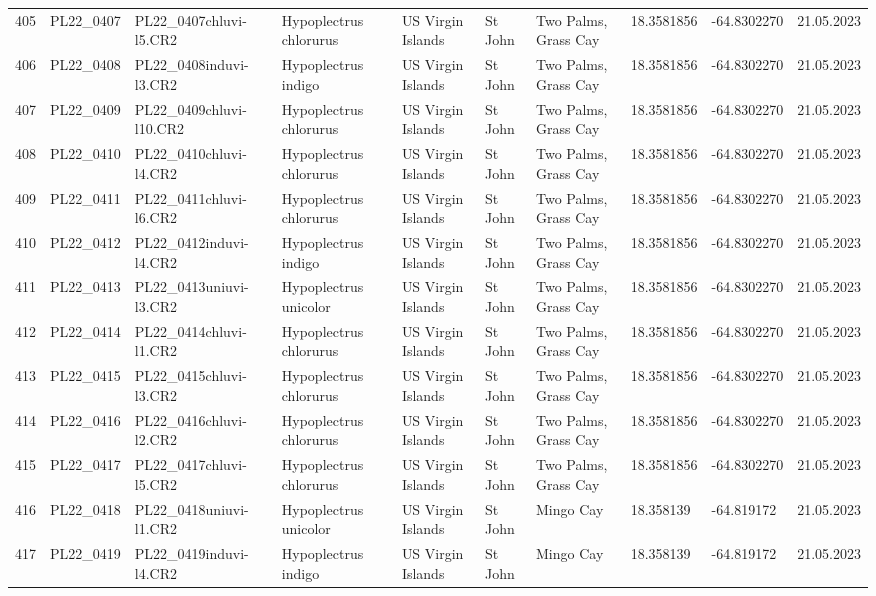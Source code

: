 \begin{table}[ht]
\begin{tabular}{rlllllllll}
  405 & PL22\_0407 & PL22\_0407chluvi-l5.CR2 & Hypoplectrus chlorurus & US Virgin Islands & St John & Two Palms, Grass Cay & 18.3581856 & -64.8302270 & 21.05.2023 \\ 
  406 & PL22\_0408 & PL22\_0408induvi-l3.CR2 & Hypoplectrus indigo & US Virgin Islands & St John & Two Palms, Grass Cay & 18.3581856 & -64.8302270 & 21.05.2023 \\ 
  407 & PL22\_0409 & PL22\_0409chluvi-l10.CR2 & Hypoplectrus chlorurus & US Virgin Islands & St John & Two Palms, Grass Cay & 18.3581856 & -64.8302270 & 21.05.2023 \\ 
  408 & PL22\_0410 & PL22\_0410chluvi-l4.CR2 & Hypoplectrus chlorurus & US Virgin Islands & St John & Two Palms, Grass Cay & 18.3581856 & -64.8302270 & 21.05.2023 \\ 
  409 & PL22\_0411 & PL22\_0411chluvi-l6.CR2 & Hypoplectrus chlorurus & US Virgin Islands & St John & Two Palms, Grass Cay & 18.3581856 & -64.8302270 & 21.05.2023 \\ 
  410 & PL22\_0412 & PL22\_0412induvi-l4.CR2 & Hypoplectrus indigo & US Virgin Islands & St John & Two Palms, Grass Cay & 18.3581856 & -64.8302270 & 21.05.2023 \\ 
  411 & PL22\_0413 & PL22\_0413uniuvi-l3.CR2 & Hypoplectrus unicolor & US Virgin Islands & St John & Two Palms, Grass Cay & 18.3581856 & -64.8302270 & 21.05.2023 \\ 
  412 & PL22\_0414 & PL22\_0414chluvi-l1.CR2 & Hypoplectrus chlorurus & US Virgin Islands & St John & Two Palms, Grass Cay & 18.3581856 & -64.8302270 & 21.05.2023 \\ 
  413 & PL22\_0415 & PL22\_0415chluvi-l3.CR2 & Hypoplectrus chlorurus & US Virgin Islands & St John & Two Palms, Grass Cay & 18.3581856 & -64.8302270 & 21.05.2023 \\ 
  414 & PL22\_0416 & PL22\_0416chluvi-l2.CR2 & Hypoplectrus chlorurus & US Virgin Islands & St John & Two Palms, Grass Cay & 18.3581856 & -64.8302270 & 21.05.2023 \\ 
  415 & PL22\_0417 & PL22\_0417chluvi-l5.CR2 & Hypoplectrus chlorurus & US Virgin Islands & St John & Two Palms, Grass Cay & 18.3581856 & -64.8302270 & 21.05.2023 \\ 
  416 & PL22\_0418 & PL22\_0418uniuvi-l1.CR2 & Hypoplectrus unicolor & US Virgin Islands & St John & Mingo Cay & 18.358139 & -64.819172 & 21.05.2023 \\ 
  417 & PL22\_0419 & PL22\_0419induvi-l4.CR2 & Hypoplectrus indigo & US Virgin Islands & St John & Mingo Cay & 18.358139 & -64.819172 & 21.05.2023 \\ 

\end{tabular}
\end{table}
